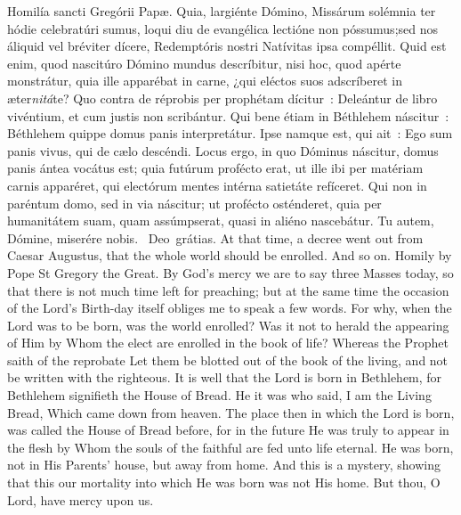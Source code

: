 {{    \begin{parcolumns}[rulebetween,colwidths={1=.47\linewidth}]{2}
    {Homilía sancti Gregórii Papæ.}%
    {Quia, largiénte Dómino, Missárum solémnia ter hódie celebratúri sumus, loqui diu de evangélica lectióne non póssumus;}{sed nos áliquid vel bréviter dícere, Redemptóris nostri Natívitas ipsa compéllit. Quid est enim, quod nascitúro Dómino mundus descríbitur, nisi hoc, quod apérte monstrátur, quia ille apparébat in carne, ¿qui eléctos suos adscríberet in æter\emph{nitá}te? Quo contra de réprobis per prophétam dícitur~: Deleántur de libro vivéntium, et cum justis non scribántur. Qui bene étiam in Béthlehem náscitur~: Béthlehem quippe domus panis interpretátur. Ipse namque est, qui ait~: Ego sum panis vivus, qui de cælo descéndi. Locus ergo, in quo Dóminus náscitur, domus panis ántea vocátus est; quia futúrum profécto erat, ut ille ibi per matériam carnis apparéret, qui electórum mentes intérna satietáte refíceret. Qui non in paréntum domo, sed in via náscitur; ut profécto osténderet, quia per humanitátem suam, quam assúmpserat, quasi in aliéno nascebátur.
      Tu autem, Dómine, miserére nobis.
      \Rbar{}~Deo~grátias.}
    {At that time, a decree went out from Caesar Augustus, that the whole world should be enrolled. And so on.}
    {Homily by Pope St Gregory the Great.}
    {By God's mercy we are to say three Masses today, so that there is not much time left for preaching; but at the same time the occasion of the Lord's Birth-day itself obliges me to speak a few words. For why, when the Lord was to be born, was the world enrolled? Was it not to herald the appearing of Him by Whom the elect are enrolled in the book of life? Whereas the Prophet saith of the reprobate Let them be blotted out of the book of the living, and not be written with the righteous. It is well that the Lord is born in Bethlehem, for Bethlehem signifieth the House of Bread. He it was who said, I am the Living Bread, Which came down from heaven. The place then in which the Lord is born, was called the House of Bread before, for in the future He was truly to appear in the flesh by Whom the souls of the faithful are fed unto life eternal. He was born, not in His Parents' house, but away from home. And this is a mystery, showing that this our mortality into which He was born was not His home.
      But thou, O Lord, have mercy upon us.}
    \end{parcolumns}

}}
